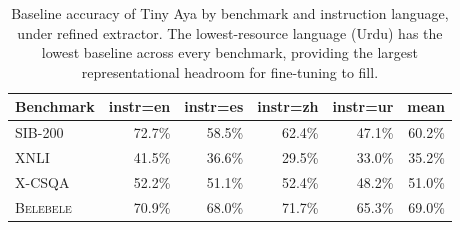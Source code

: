 \begin{table}[t]
  \centering
  \small
  \begin{tabular}{lrrrrr}
    \toprule
    Benchmark & instr=en & instr=es & instr=zh & instr=ur & mean \\
    \midrule
    \textsc{SIB-200} & 72.7\% & 58.5\% & 62.4\% & 47.1\% & 60.2\% \\
    \textsc{XNLI} & 41.5\% & 36.6\% & 29.5\% & 33.0\% & 35.2\% \\
    \textsc{X-CSQA} & 52.2\% & 51.1\% & 52.4\% & 48.2\% & 51.0\% \\
    \textsc{Belebele} & 70.9\% & 68.0\% & 71.7\% & 65.3\% & 69.0\% \\
    \bottomrule
  \end{tabular}
  \caption{Baseline accuracy of Tiny Aya by benchmark and instruction language, under refined extractor. The lowest-resource language (Urdu) has the lowest baseline across every benchmark, providing the largest representational headroom for fine-tuning to fill.}
  \label{tab:baseline-headroom}
\end{table}


